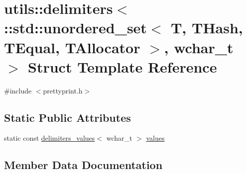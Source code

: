 \hypertarget{structutils_1_1delimiters_3_01_1_1std_1_1unordered__set_3_01_t_00_01_t_hash_00_01_t_equal_00_01_7664ae63421d022171aa24890067c483}{}\section{utils\+::delimiters$<$ \+::std\+::unordered\+\_\+set$<$ T, T\+Hash, T\+Equal, T\+Allocator $>$, wchar\+\_\+t $>$ Struct Template Reference}
\label{structutils_1_1delimiters_3_01_1_1std_1_1unordered__set_3_01_t_00_01_t_hash_00_01_t_equal_00_01_7664ae63421d022171aa24890067c483}


{\ttfamily \#include $<$prettyprint.\+h$>$}

\subsection*{Static Public Attributes}
\begin{DoxyCompactItemize}
\item 
static const \mbox{\hyperlink{structutils_1_1delimiters__values}{delimiters\+\_\+values}}$<$ wchar\+\_\+t $>$ \mbox{\hyperlink{structutils_1_1delimiters_3_01_1_1std_1_1unordered__set_3_01_t_00_01_t_hash_00_01_t_equal_00_01_7664ae63421d022171aa24890067c483_ab388f273820482174258f1c26a14015e}{values}}
\end{DoxyCompactItemize}


\subsection{Member Data Documentation}
\mbox{\label{structutils_1_1delimiters_3_01_1_1std_1_1unordered__set_3_01_t_00_01_t_hash_00_01_t_equal_00_01_7664ae63421d022171aa24890067c483_ab388f273820482174258f1c26a14015e}} 
